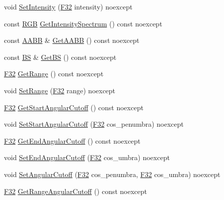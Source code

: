 \begin{DoxyCompactItemize}
\item 
void \hyperlink{classmage_1_1_spot_light_a947290df545ea2a8ef2b486898b92bd3}{Set\+Intensity} (\hyperlink{namespacemage_aa97e833b45f06d60a0a9c4fc22ae02c0}{F32} intensity) noexcept
\item 
const \hyperlink{structmage_1_1_r_g_b}{R\+GB} \hyperlink{classmage_1_1_spot_light_ad05d3abab9285f8c25ac42ee446d6e05}{Get\+Intensity\+Spectrum} () const noexcept
\item 
const \hyperlink{classmage_1_1_a_a_b_b}{A\+A\+BB} \& \hyperlink{classmage_1_1_spot_light_add184856d7fdb2ff9ae16221d9493bf5}{Get\+A\+A\+BB} () const noexcept
\item 
const \hyperlink{classmage_1_1_b_s}{BS} \& \hyperlink{classmage_1_1_spot_light_acd80a0f565e74650c97f1680938ae997}{Get\+BS} () const noexcept
\item 
\hyperlink{namespacemage_aa97e833b45f06d60a0a9c4fc22ae02c0}{F32} \hyperlink{classmage_1_1_spot_light_a19baba95ca8c5f5f6147ab0a03e6b64a}{Get\+Range} () const noexcept
\item 
void \hyperlink{classmage_1_1_spot_light_a96f8d35fe374f9d06c49d68a3ac1f213}{Set\+Range} (\hyperlink{namespacemage_aa97e833b45f06d60a0a9c4fc22ae02c0}{F32} range) noexcept
\item 
\hyperlink{namespacemage_aa97e833b45f06d60a0a9c4fc22ae02c0}{F32} \hyperlink{classmage_1_1_spot_light_a649e84aaf1f98c605f14d9597241df72}{Get\+Start\+Angular\+Cutoff} () const noexcept
\item 
void \hyperlink{classmage_1_1_spot_light_afae0adbfe0da1a897696a90294c93aef}{Set\+Start\+Angular\+Cutoff} (\hyperlink{namespacemage_aa97e833b45f06d60a0a9c4fc22ae02c0}{F32} cos\+\_\+penumbra) noexcept
\item 
\hyperlink{namespacemage_aa97e833b45f06d60a0a9c4fc22ae02c0}{F32} \hyperlink{classmage_1_1_spot_light_ad9c4cabf950619605a8040e41b9acb5b}{Get\+End\+Angular\+Cutoff} () const noexcept
\item 
void \hyperlink{classmage_1_1_spot_light_a2c200dc6f60a0c9a072680a9c5ee12d5}{Set\+End\+Angular\+Cutoff} (\hyperlink{namespacemage_aa97e833b45f06d60a0a9c4fc22ae02c0}{F32} cos\+\_\+umbra) noexcept
\item 
void \hyperlink{classmage_1_1_spot_light_aff7fad222e3c8e41d6fbeeea7f3a0893}{Set\+Angular\+Cutoff} (\hyperlink{namespacemage_aa97e833b45f06d60a0a9c4fc22ae02c0}{F32} cos\+\_\+penumbra, \hyperlink{namespacemage_aa97e833b45f06d60a0a9c4fc22ae02c0}{F32} cos\+\_\+umbra) noexcept
\item 
\hyperlink{namespacemage_aa97e833b45f06d60a0a9c4fc22ae02c0}{F32} \hyperlink{classmage_1_1_spot_light_ada7b32eb18cc2bb6707a62c4ab72f4f2}{Get\+Range\+Angular\+Cutoff} () const noexcept

\end{DoxyCompactItemize}
